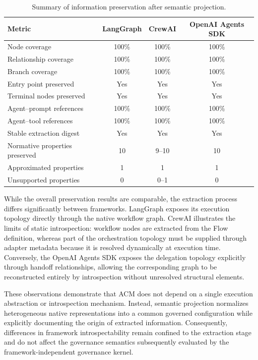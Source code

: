 \documentclass[10pt]{article}
\begin{document}
\begin{table}[t]
	\centering
	\caption{Summary of information preservation after semantic projection.}
	\label{tab:projection_results}
	\small
	\begin{tabular}{lccc}
		\toprule
		\textbf{Metric}
		&
		\textbf{LangGraph}
		&
		\textbf{CrewAI}
		&
		\textbf{OpenAI Agents SDK}
		\\
		\midrule
		Node coverage & 100\% & 100\% & 100\% \\
		Relationship coverage & 100\% & 100\% & 100\% \\
		Branch coverage & 100\% & 100\% & 100\% \\
		Entry point preserved & Yes & Yes & Yes \\
		Terminal nodes preserved & Yes & Yes & Yes \\
		Agent--prompt references & 100\% & 100\% & 100\% \\
		Agent--tool references & 100\% & 100\% & 100\% \\
		Stable extraction digest & Yes & Yes & Yes \\
		Normative properties preserved & 10 & 9--10 & 10 \\
		Approximated properties & 1 & 1 & 1 \\
		Unsupported properties & 0 & 0--1 & 0 \\
		\bottomrule
	\end{tabular}
\end{table}

While the overall preservation results are comparable, the extraction process differs significantly between frameworks. LangGraph exposes its execution topology directly through the native workflow graph. CrewAI illustrates the limits of static introspection: workflow nodes are extracted from the Flow definition, whereas part of the orchestration topology must be supplied through adapter metadata because it is resolved dynamically at execution time. Conversely, the OpenAI Agents SDK exposes the delegation topology explicitly through handoff relationships, allowing the corresponding graph to be reconstructed entirely by introspection without unresolved structural elements.

These observations demonstrate that ACM does not depend on a single execution abstraction or introspection mechanism. Instead, semantic projection normalizes heterogeneous native representations into a common governed configuration while explicitly documenting the origin of extracted information. Consequently, differences in framework introspectability remain confined to the extraction stage and do not affect the governance semantics subsequently evaluated by the framework-independent governance kernel.
\end{document}
